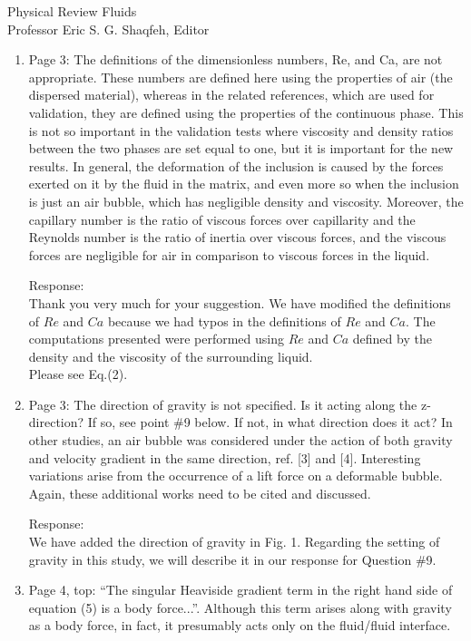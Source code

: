 \documentclass{letter}
\begin{document}
\begin{letter}{
Physical Review Fluids\\
Professor Eric S. G. Shaqfeh, Editor\\}
\begin{enumerate}
\par\noindent
\item
\textsf
{Page 3: The definitions of the dimensionless numbers, Re, and Ca, are not
appropriate.  These numbers are defined here using the properties of air (the
dispersed material), whereas in the related references, which are used for
validation, they are defined using the properties of the continuous phase.
This is not so important in the validation tests where viscosity and density
ratios between the two phases are set equal to one, but it is important for the
new results. In general, the deformation of the inclusion is caused by the
forces exerted on it by the fluid in the matrix, and even more so when the
inclusion is just an air bubble, which has negligible density and viscosity.
Moreover, the capillary number is the ratio of viscous forces over capillarity
and the Reynolds number is the ratio of inertia over viscous forces, and the
viscous forces are negligible for air in comparison to viscous forces in the
liquid.}
\vspace{3 mm}

Response: \\
Thank you very much for your suggestion.  We have modified the definitions of
$Re$ and $Ca$ because we had typos in the definitions of $Re$ and $Ca$.  The
computations presented were performed using $Re$ and $Ca$ defined by the
density and the viscosity of the surrounding liquid.
\\
Please see Eq.(2).
\\

\par\noindent
\item
\textsf
{Page 3: The direction of gravity is not specified. Is it acting along the
z-direction? If so, see point \#9 below.  If not, in what direction does it
act? In other studies, an air bubble was considered under the action of both
gravity and velocity gradient in the same direction, ref. [3] and [4].
Interesting variations arise from the occurrence of a lift force on a
deformable bubble. Again, these additional works need to be cited and
discussed.}
\vspace{3 mm}

Response: \\
We have added the direction of gravity in Fig. 1. Regarding the setting of
gravity in this study, we will describe it in our response for Question \#9. 
\\

\par\noindent
\item
\textsf
{Page 4, top: “The singular Heaviside gradient term in the right hand side of
equation (5) is a body force...”. Although this term arises along with gravity
as a body force, in fact, it presumably acts only on the fluid/fluid
interface.}
\vspace{3 mm}


\end{enumerate}
\end{letter}
\end{document}
